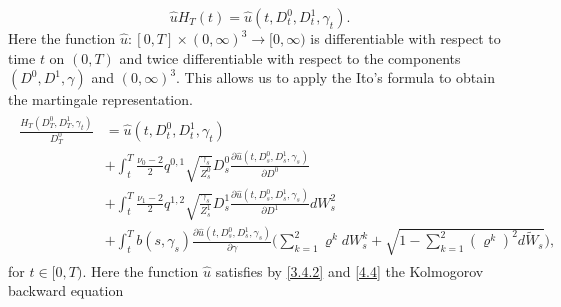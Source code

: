 \documentclass[a4 paper, 12pt]{report}
\theoremstyle{plain}
\begin{document}
\begin{equation}\label{5.4}
\hat{u}H_T(t) = \hat{u}(t,D_t^0, D_t^1,\gamma_t).
\end{equation}
Here the function $\hat{u}:[0,T]\times(0,\infty)^3\rightarrow [0,\infty)$ is differentiable with respect to time $t$ on $(0,T)$ and twice differentiable with respect to the components $(D^0,D^1,\gamma)$ and $(0,\infty)^3$. This allows  us to apply the Ito's formula to obtain the martingale representation.
\begin{align}\label{5.5}
\begin{split}
\frac{H_T(D_T^0,D_T^1,\gamma_t)}{D_T^0}& = \hat{u}(t, D_t^0, D_t^1,\gamma_t)\\
&+\int_t^T\frac{\nu_0-2}{2}q^{0,1}\sqrt{\frac{\gamma_s}{Z_s^0}}D_s^0\frac{\partial\hat{u}(t, D_s^0, D_s^1,\gamma_s)}{\partial D^0}\\
&+\int_t^T\frac{\nu_1 - 2}{2}q^{1,2}\sqrt{\frac{\gamma_s}{Z_s^1}}D_s^1\frac{\partial\hat{u}(t, D_s^0, D_s^1,\gamma_s)}{\partial D^1} dW_s^2\\
&+\int_t^Tb(s,\gamma_s)\frac{\partial\hat{u}(t,D_s^0, D_s^1,\gamma_s)}{\partial\gamma}\bigg(\sum_{k = 1}^2\varrho^kdW_s^k+\sqrt{1-\sum_{k = 1}^2(\varrho^k)^2d\tilde{W}_s}\bigg),
\end{split}
\end{align}
for $t \in [0, T )$. Here the function $\hat{u}$ satisfies by \eqref{3.4.2} and \eqref{4.4} the Kolmogorov
backward equation
\end{document}
